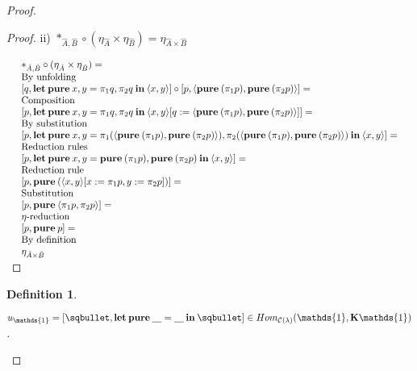\documentclass[a4paper]{article}
\newtheorem{defin}{Definition}
\begin{document}
\begin{proof}
\begin{proof}
\vspace{\baselineskip}

ii) $\ast_{\hat{A},\hat{B}} \circ (\eta_{\hat{A}} \times \eta_{\hat{B}}) = \eta_{\hat{A} \times \hat{B}}$

\vspace{\baselineskip}

$\begin{array}{lll}
& \ast_{\hat{A},\hat{B}} \circ (\eta_{\hat{A}} \times \eta_{\hat{B}}) = & \\
& \text{By unfolding} & \\
& [q, {\bf let \: pure \:} x, y = \pi_1 q, \pi_2 q {\: \bf in \:} \langle x, y \rangle] \circ [p, \langle {\bf pure \:} (\pi_1 p), {\bf pure \:} (\pi_2 p) \rangle] = & \\
& \text{Composition}& \\
& [p, {\bf let \: pure \:} x, y = \pi_1 q, \pi_2 q {\: \bf in \:} \langle x, y \rangle [q := \langle {\bf pure \:} (\pi_1 p), {\bf pure \:} (\pi_2 p) \rangle]] = & \\
& \text{By substitution}& \\
& [p, {\bf let \: pure \:} x, y = \pi_1 (\langle {\bf pure \:} (\pi_1 p), {\bf pure \:} (\pi_2 p) \rangle), \pi_2 (\langle {\bf pure \:} (\pi_1 p), {\bf pure \:} (\pi_2 p) \rangle) {\: \bf in \:} \langle x, y \rangle] = & \\
& \text{Reduction rules}& \\
& [p, {\bf let \: pure \:} x, y = {\bf pure \:} (\pi_1 p), {\bf pure \:} (\pi_2 p) {\: \bf in \:} \langle x, y \rangle] = & \\
& \text{Reduction rule}& \\
& [p, {\bf pure \:} (\langle x,y \rangle [x := \pi_1 p, y := \pi_2 p])] = & \\
& \text{Substitution}& \\
& [p, {\bf pure \:} \langle \pi_1 p, \pi_2 p \rangle] = & \\
& \text{$\eta$-reduction}& \\
& [p, {\bf pure \:} p] =& \\
& \text{By definition}& \\
& \eta_{\hat{A} \times \hat{B}}&
\end{array}$

\end{proof}

\begin{defin}
  $ $

  $u_{\mathds{1}} = [\sqbullet, {\bf let \: pure \:} \underline{\quad} = \underline{\quad} {\: \bf in \:} \sqbullet] \in Hom_{\mathcal{C}(\lambda)}(\mathds{1}, {\bf K}\mathds{1})$.
\end{defin}


\end{proof}
\end{document}
